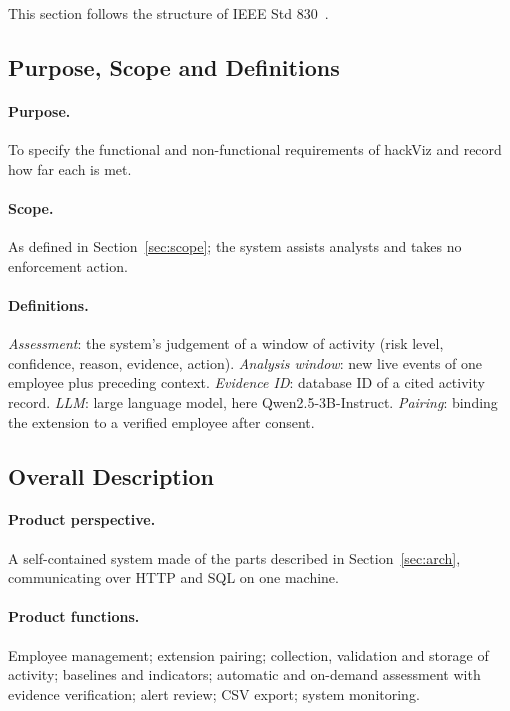 \documentclass[openany]{tietreport}
\begin{document}
This section follows the structure of IEEE Std 830~\cite{ieee830}.

\subsection{Purpose, Scope and Definitions}

\paragraph{Purpose.} To specify the functional and non-functional requirements of hackViz and record how
far each is met.

\paragraph{Scope.} As defined in Section~\ref{sec:scope}; the system assists analysts and takes no
enforcement action.

\paragraph{Definitions.} \emph{Assessment}: the system's judgement of a window of activity (risk level,
confidence, reason, evidence, action). \emph{Analysis window}: new live events of one employee plus
preceding context. \emph{Evidence ID}: database ID of a cited activity record. \emph{LLM}: large
language model, here Qwen2.5-3B-Instruct. \emph{Pairing}: binding the extension to a verified employee
after consent.

\subsection{Overall Description}

\paragraph{Product perspective.} A self-contained system made of the parts described in
Section~\ref{sec:arch}, communicating over HTTP and SQL on one machine.

\paragraph{Product functions.} Employee management; extension pairing; collection, validation and
storage of activity; baselines and indicators; automatic and on-demand assessment with evidence
verification; alert review; CSV export; system monitoring.
\end{document}
